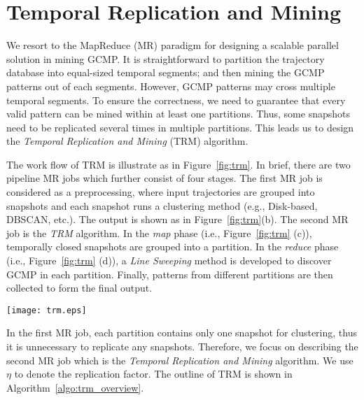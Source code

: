 \section{Temporal Replication and Mining}
\label{sec:trm}
We resort to the MapReduce (MR) paradigm for designing 
a scalable parallel solution in mining GCMP. It is straightforward 
to partition the trajectory database into equal-sized 
temporal segments; and then mining the GCMP patterns out of each segments. However, GCMP
patterns may cross multiple temporal segments. To ensure
the correctness, we need to guarantee that
every valid pattern can be mined within at least 
one partitions.
Thus, some snapshots need to be 
replicated several times in multiple partitions. This
leads us to design the \emph{Temporal Replication and Mining}
(TRM) algorithm.

The work flow of TRM is illustrate as in Figure~\ref{fig:trm}. 
In brief, there are two pipeline MR jobs which further consist of four stages. 
The first MR job is considered as a preprocessing, where input trajectories
are grouped into snapshots and each snapshot runs a clustering method (e.g., Disk-based, DBSCAN, etc.).
The output is shown as in Figure~\ref{fig:trm}(b). The second
MR job is the \emph{TRM} algorithm. In the \emph{map} phase 
(i.e., Figure~\ref{fig:trm} (c)), temporally closed snapshots are grouped
into a partition. In the \emph{reduce} phase (i.e., Figure~\ref{fig:trm} (d)),
a \emph{Line Sweeping} method is developed to discover GCMP in each partition. Finally,
patterns from different partitions are then collected to form the final output.

\begin{figure*} [t]
\center
\texttt{[image: trm.eps]}
\caption{Work flow of Temporal Replication and Mining. (a)(b) correspond to the first MR job which computes the clusters at each snapshot; 
(c)(d) correspond to the second MR job which uses TRM to mine GCMP in parallel.}
\label{fig:trm}
\end{figure*}

In the first MR job, each partition contains only one snapshot
for clustering, thus it is unnecessary to replicate any snapshots. Therefore, we
focus on describing the second MR job which is the \emph{Temporal
Replication and Mining} algorithm. We use $\eta$ to denote the replication factor.
The outline of TRM is 
shown in Algorithm~\ref{algo:trm_overview}.

